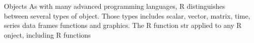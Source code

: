
Objects
As with many advanced programming languages, R distinguishes between several types of object. 
Those types includes scalar, vector, matrix, time, series data frames functions and graphics.
The R function str applied to any R onject, including R functions


